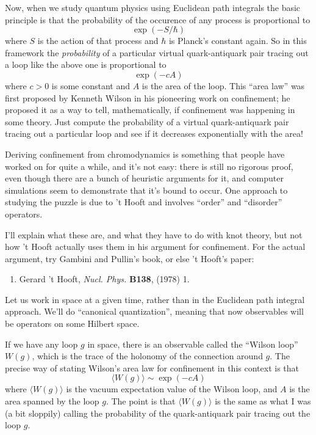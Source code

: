 \documentclass{article}
\def\tightlist{}
\begin{document}
Now, when we study quantum physics using Euclidean path integrals the
basic principle is that the probability of the occurence of any process
is proportional to \[\exp(-S/\hbar)\] where \(S\) is the action of that
process and \(\hbar\) is Planck's constant again. So in this framework
the \emph{probability} of a particular virtual quark-antiquark pair
tracing out a loop like the above one is proportional to \[\exp(-cA)\]
where \(c > 0\) is some constant and \(A\) is the area of the loop. This
``area law'' was first proposed by Kenneth Wilson in his pioneering work
on confinement; he proposed it as a way to tell, mathematically, if
confinement was happening in some theory. Just compute the probability
of a virtual quark-antiquark pair tracing out a particular loop and see
if it decreases exponentially with the area!

Deriving confinement from chromodynamics is something that people have
worked on for quite a while, and it's not easy: there is still no
rigorous proof, even though there are a bunch of heuristic arguments for
it, and computer simulations seem to demonstrate that it's bound to
occur. One approach to studying the puzzle is due to 't Hooft and
involves ``order'' and ``disorder'' operators.

I'll explain what these are, and what they have to do with knot theory,
but not how 't Hooft actually uses them in his argument for confinement.
For the actual argument, try Gambini and Pullin's book, or else 't
Hooft's paper:

\begin{enumerate}
\def\labelenumi{\arabic{enumi})}
\setcounter{enumi}{4}
\tightlist
\item
  Gerard 't Hooft, \emph{Nucl. Phys.} \textbf{B138}, (1978) 1.
\end{enumerate}

Let us work in space at a given time, rather than in the Euclidean path
integral approach. We'll do ``canonical quantization'', meaning that now
observables will be operators on some Hilbert space.

If we have any loop \(g\) in space, there is an observable called the
``Wilson loop'' \(W(g)\), which is the trace of the holonomy of the
connection around \(g\). The precise way of stating Wilson's area law
for confinement in this context is that
\[\langle W(g) \rangle \sim \exp(-cA)\] where \(\langle W(g) \rangle\)
is the vacuum expectation value of the Wilson loop, and \(A\) is the
area spanned by the loop \(g\). The point is that
\(\langle W(g) \rangle\) is the same as what I was (a bit sloppily)
calling the probability of the quark-antiquark pair tracing out the loop
\(g\).
\end{document}
